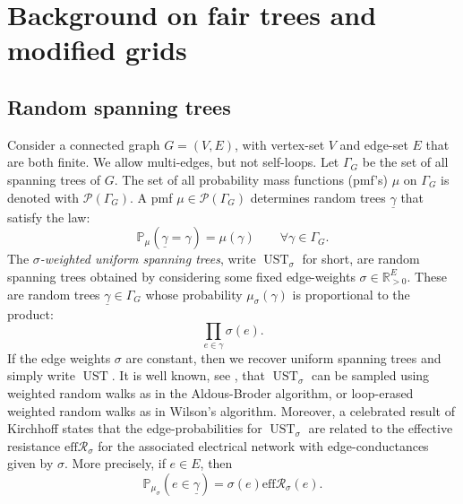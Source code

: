 \documentclass[preprint,12pt]{elsarticle}
\theoremstyle{definition}
\theoremstyle{remark}
\numberwithin{equation}{section}
\newcommand{\cP}{\mathcal{P}}
\newcommand{\bP}{\mathbb{P}}
\newcommand{\R}{\mathbb{R}}
\newcommand{\si}{\sigma }
\newcommand{\ga}{\gamma }
\newcommand{\Ga}{\Gamma }
\newcommand{\cReff}{\eff\mathcal{R}}
\newcommand{\eff}{\textrm{eff}}
\newcommand{\UST}{\operatorname{UST}}
\begin{document}
\section{Background on fair trees and modified grids}\label{background}
\subsection{Random spanning trees}
Consider a connected graph $G=(V,E)$, with vertex-set $V$ and edge-set $E$ that are both finite. We allow multi-edges, but not self-loops. Let $\Ga_G$ be the set of all spanning trees of $G$. The set of all probability mass functions (pmf's) $\mu$ on $\Ga_G$ is denoted with $\cP(\Ga_G)$. A pmf $\mu\in\cP(\Ga_G)$ determines  random trees $\underline{\ga}$ that satisfy the law:
\[
\bP_\mu\left(\underline{\ga}=\ga\right)=\mu(\ga)\qquad\forall \ga\in\Ga_G.
\]
The {\it $\si$-weighted uniform spanning trees}, write  $\UST_\si$ for short, are random spanning trees obtained by considering some fixed edge-weights $\si\in\R_{>0}^E$. 
These are random trees $\underline{\ga}\in\Ga_G$ whose probability $\mu_\si(\ga)$ is proportional to  the product:
\[
\prod_{e\in \ga} \si(e).
\]
If the edge weights $\si$ are constant, then we recover uniform spanning trees and simply write $\UST$.
It is well known, see \cite[Chapter 4]{LP:book}, that $\UST_\si$ can be sampled using weighted random walks as in the Aldous-Broder algorithm, or  loop-erased weighted random walks as in Wilson's algorithm. Moreover, a celebrated result of Kirchhoff states that the edge-probabilities for $\UST_\si$ are related to the effective resistance $\cReff_\si$ for the associated electrical network with edge-conductances given by $\si$. More precisely, if $e\in E$, then
\begin{equation}\label{eq:peredgeeffres}
\bP_{\mu_\si}\left(e\in \underline{\ga}\right) = \si(e)\cReff_\si(e).
\end{equation}
\end{document}
